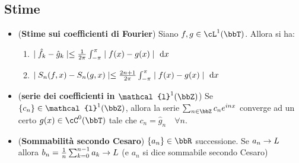 \documentclass[a4paper,NoNotes,GeneralMath]{stdmdoc}
\newcommand{\intpie}{\int_{-\pi}^\pi }
\newcommand{\fractopie}{\frac{1}{2\pi}}
\newcommand{\CT}[1]{\cC^{#1}(\bbT)}
\newcommand{\LT}[1]{\cL^{#1}(\bbT)}
\newcommand{\cl}{\mathcal{l}}
\begin{document}
        \subsection*{Stime}
        \begin{itemize}
        \item ({\bf Stime sui coefficienti di Fourier}) Siano $f, g \in \LT{1}$. Allora si ha:
          \begin{enumerate}
          \item $\abs{\hat{f}_k - \hat{g}_k} \le \fractopie \intpie \abs{f(x) - g(x)} \de x$
          \item $\abs{S_n(f, x) - S_n(g, x)} \le \frac{2n+1}{2\pi} \intpie \abs{f(x) - g(x)} \de x$
          \end{enumerate}
        \item ({\bf serie dei coefficienti in $\cl^1(\bbZ)$}) Se $\{c_n\} \in \cl^1(\bbZ)$, allora la serie $\sum_{n \in \bbZ} c_n e^{inx}$ converge ad un certo $g(x) \in \CT{0}$ tale che $c_n = \hat{g}_n \quad \forall n$.
          \item ({\bf Sommabilità secondo Cesaro}) $\{a_n\} \in \bbR$ successione. Se $a_n \rightarrow L$ allora $b_n = \frac{1}{n} \sum_{k=0}^{n-1} a_k \rightarrow L$ (e $a_n$ si dice sommabile secondo Cesaro)
        \end{itemize}
\end{document}
